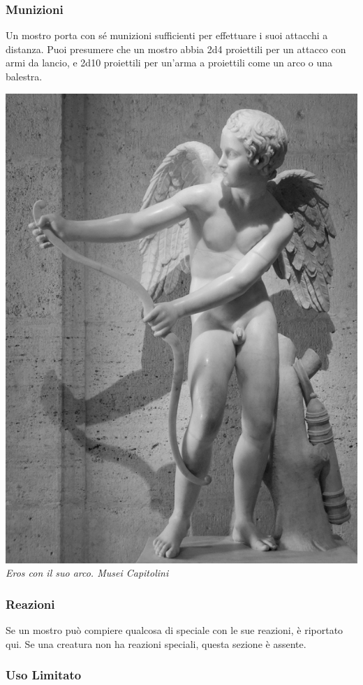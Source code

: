 \begin{multicols}{2}
\subsubsection{Munizioni}

Un mostro porta con sé munizioni sufficienti per effettuare i suoi attacchi a distanza. Puoi presumere che un mostro abbia 2d4 proiettili per un attacco con armi da lancio, e 2d10 proiettili per un'arma a proiettili come un arco o una balestra.

\begin{center}
	\includegraphics[width=0.7\linewidth]{immagini/cupido.png}\\
	\textit{Eros con il suo arco. Musei Capitolini}
\end{center}



\subsubsection{Reazioni}

Se un mostro può compiere qualcosa di speciale con le sue reazioni, è riportato qui. Se una creatura non ha reazioni speciali, questa sezione è assente.

\subsubsection{Uso Limitato}


\end{multicols}
